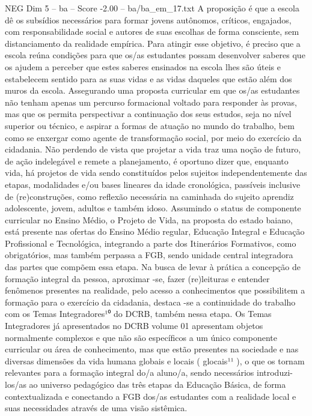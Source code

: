 \begin{textsample}{NEG Dim 5 – ba – Score -2.00 – ba/ba\_em\_17.txt}
A proposição é que a escola dê os subsídios necessários para formar jovens autônomos, críticos, engajados, com responsabilidade social e autores de suas escolhas de forma consciente, sem distanciamento da realidade empírica.
Para atingir esse objetivo, é preciso que a escola reúna condições para que os/as estudantes possam desenvolver saberes que os ajudem a perceber que estes saberes ensinados na escola lhes são úteis e estabelecem sentido para as suas vidas e as vidas daqueles que estão além dos muros da escola.
Assegurando uma proposta curricular em que os/as estudantes não tenham apenas um percurso formacional voltado para responder às provas, mas que os permita perspectivar a continuação dos seus estudos, seja no nível superior ou técnico, e aspirar a formas de atuação no mundo do trabalho, bem como se enxergar como agente de transformação social, por meio do exercício da cidadania.
Não perdendo de vista que projetar a vida traz uma noção de futuro, de ação indelegável e remete a planejamento, é oportuno dizer que, enquanto vida, há projetos de vida sendo constituídos pelos sujeitos independentemente das etapas, modalidades e/ou bases lineares da idade cronológica, passíveis inclusive de (re)construções, como reflexão necessária na caminhada do sujeito aprendiz adolescente, jovem, adultos e também idoso.
Assumindo o status de componente curricular no Ensino Médio, o Projeto de Vida, na proposta do estado baiano, está presente nas ofertas do Ensino Médio regular, Educação Integral e Educação Profissional e Tecnológica, integrando a parte dos Itinerários Formativos, como obrigatórios, mas também perpassa a FGB, sendo unidade central integradora das partes que compõem essa etapa.
Na busca de levar à prática a concepção de formação integral da pessoa, aproximar -se, fazer (re)leituras e entender fenômenos presentes na realidade, pelo acesso a conhecimentos que possibilitem a formação para o exercício da cidadania, destaca -se a continuidade do trabalho com os Temas Integradores¹⁰ do DCRB, também nessa etapa.
Os Temas Integradores já apresentados no DCRB volume 01 apresentam objetos normalmente complexos e que não são específicos a um único componente curricular ou área de conhecimento, mas que estão presentes na sociedade e nas diversas dimensões da vida humana globais e locais ( glocais¹¹ ), o que os tornam relevantes para a formação integral do/a aluno/a, sendo necessários introduzi-los/as ao universo pedagógico das três etapas da Educação Básica, de forma contextualizada e conectando a FGB dos/as estudantes com a realidade local e suas necessidades através de uma visão sistêmica.

\end{textsample}
